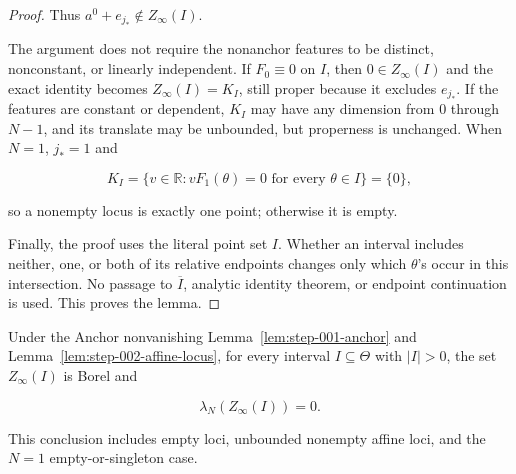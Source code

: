 \begin{proof}
Thus \(a^0+e_{j_*}\notin Z_\infty(I)\).

The argument does not require the nonanchor features to be distinct, nonconstant, or linearly independent. If
\(F_0\equiv0\) on \(I\), then \(0\in Z_\infty(I)\) and the exact identity becomes
\(Z_\infty(I)=K_I\), still proper because it excludes \(e_{j_*}\). If the features are constant or dependent,
\(K_I\) may have any dimension from \(0\) through \(N-1\), and its translate may be unbounded, but properness
is unchanged. When \(N=1\), \(j_*=1\) and

\begin{equation}
\label{eq:appendix-display-040}
K_I=\{v\in\mathbb R:vF_1(\theta)=0\text{ for every }\theta\in I\}=\{0\},
\end{equation}

so a nonempty locus is exactly one point; otherwise it is empty.

Finally, the proof uses the literal point set \(I\). Whether an interval includes neither, one, or both of its
relative endpoints changes only which \(\theta\)'s occur in this intersection. No passage to
\(\overline I\), analytic identity theorem, or endpoint continuation is used. This proves the lemma.

\end{proof}

\begin{lemma}
\label{lem:step-002-lebesgue-null}

Under the Anchor nonvanishing Lemma~\ref{lem:step-001-anchor} and
Lemma~\ref{lem:step-002-affine-locus}, for every interval \(I\subseteq\Theta\) with
\(\lvert I\rvert>0\), the set \(Z_\infty(I)\) is Borel and

\begin{equation}
\label{eq:appendix-display-041}
\lambda_N(Z_\infty(I))=0.
\end{equation}

This conclusion includes empty loci, unbounded nonempty affine loci, and the \(N=1\) empty-or-singleton case.


\end{lemma}


